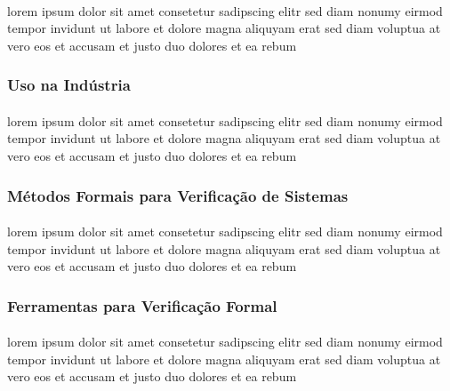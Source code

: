 \paragraph{}
lorem ipsum dolor sit amet consetetur sadipscing elitr sed diam nonumy
eirmod tempor invidunt ut labore et dolore magna aliquyam erat sed diam
voluptua at vero eos et accusam et justo duo dolores et ea rebum

\subsubsection{Uso na Indústria}
\paragraph{}
lorem ipsum dolor sit amet consetetur sadipscing elitr sed diam nonumy
eirmod tempor invidunt ut labore et dolore magna aliquyam erat sed diam
voluptua at vero eos et accusam et justo duo dolores et ea rebum

\subsubsection{Métodos Formais para Verificação de Sistemas}
\paragraph{}
lorem ipsum dolor sit amet consetetur sadipscing elitr sed diam nonumy
eirmod tempor invidunt ut labore et dolore magna aliquyam erat sed diam
voluptua at vero eos et accusam et justo duo dolores et ea rebum

\subsubsection{Ferramentas para Verificação Formal}
\paragraph{}
lorem ipsum dolor sit amet consetetur sadipscing elitr sed diam nonumy
eirmod tempor invidunt ut labore et dolore magna aliquyam erat sed diam
voluptua at vero eos et accusam et justo duo dolores et ea rebum
